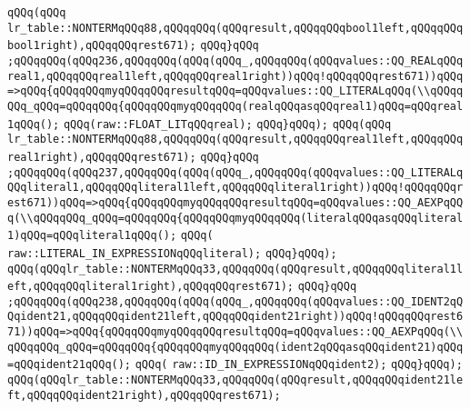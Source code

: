 \verb|qQQq(qQQq|\newline
\verb|lr_table::NONTERMqQQq88,qQQqqQQq(qQQqresult,qQQqqQQqbool1left,qQQqqQQqbool1right),qQQqqQQqrest671);|\newline
\verb|qQQq}qQQq|\newline
\verb|;qQQqqQQq(qQQq236,qQQqqQQq(qQQq(qQQq_,qQQqqQQq(qQQqvalues::QQ_REALqQQqreal1,qQQqqQQqreal1left,qQQqqQQqreal1right))qQQq!qQQqqQQqrest671))qQQq=>qQQq{qQQqqQQqmyqQQqqQQqresultqQQq=qQQqvalues::QQ_LITERALqQQq(\\qQQqqQQq_qQQq=qQQqqQQq{qQQqqQQqmyqQQqqQQq(realqQQqasqQQqreal1)qQQq=qQQqreal1qQQq();|\newline
\verb|qQQq(raw::FLOAT_LITqQQqreal);|\newline
\verb|qQQq}qQQq);|\newline
\verb|qQQq(qQQq|\newline
\verb|lr_table::NONTERMqQQq88,qQQqqQQq(qQQqresult,qQQqqQQqreal1left,qQQqqQQqreal1right),qQQqqQQqrest671);|\newline
\verb|qQQq}qQQq|\newline
\verb|;qQQqqQQq(qQQq237,qQQqqQQq(qQQq(qQQq_,qQQqqQQq(qQQqvalues::QQ_LITERALqQQqliteral1,qQQqqQQqliteral1left,qQQqqQQqliteral1right))qQQq!qQQqqQQqrest671))qQQq=>qQQq{qQQqqQQqmyqQQqqQQqresultqQQq=qQQqvalues::QQ_AEXPqQQq(\\qQQqqQQq_qQQq=qQQqqQQq{qQQqqQQqmyqQQqqQQq(literalqQQqasqQQqliteral1)qQQq=qQQqliteral1qQQq();|\newline
\verb|qQQq(|\newline
\verb|raw::LITERAL_IN_EXPRESSIONqQQqliteral);|\newline
\verb|qQQq}qQQq);|\newline
\verb|qQQq(qQQqlr_table::NONTERMqQQq33,qQQqqQQq(qQQqresult,qQQqqQQqliteral1left,qQQqqQQqliteral1right),qQQqqQQqrest671);|\newline
\verb|qQQq}qQQq|\newline
\verb|;qQQqqQQq(qQQq238,qQQqqQQq(qQQq(qQQq_,qQQqqQQq(qQQqvalues::QQ_IDENT2qQQqident21,qQQqqQQqident21left,qQQqqQQqident21right))qQQq!qQQqqQQqrest671))qQQq=>qQQq{qQQqqQQqmyqQQqqQQqresultqQQq=qQQqvalues::QQ_AEXPqQQq(\\qQQqqQQq_qQQq=qQQqqQQq{qQQqqQQqmyqQQqqQQq(ident2qQQqasqQQqident21)qQQq=qQQqident21qQQq();|\newline
\verb|qQQq(|\newline
\verb|raw::ID_IN_EXPRESSIONqQQqident2);|\newline
\verb|qQQq}qQQq);|\newline
\verb|qQQq(qQQqlr_table::NONTERMqQQq33,qQQqqQQq(qQQqresult,qQQqqQQqident21left,qQQqqQQqident21right),qQQqqQQqrest671);|\newline
